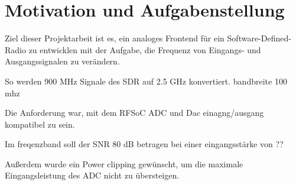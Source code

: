 \chapter{Motivation und Aufgabenstellung}

Ziel dieser Projektarbeit ist es, ein analoges Frontend für ein Software-Defined-Radio zu entwicklen mit der Aufgabe, die Frequenz von Eingangs- und Ausgangssignalen zu verändern.

So werden 900 MHz Signale des SDR auf 2.5 GHz konvertiert. bandbreite 100 mhz

Die Anforderung war, mit dem RFSoC \cite{RFSoC} ADC und Dac einagng/ausgang kompatibel zu sein. 

Im freqenzband soll der SNR 80 dB betragen bei einer eingangsstärke von ??

Außerdem wurde ein Power clipping gewünscht, um die maximale Eingangsleistung des ADC nicht zu übersteigen.